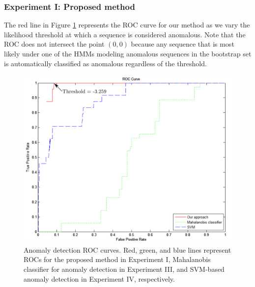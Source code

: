 \subsubsection{Experiment I: Proposed method}

The red line in Figure \ref{fig:batch-roc-results} represents the ROC
curve for our method as we vary the likelihood threshold at which a
sequence is considered anomalous.  Note that the ROC does not
intersect the point $(0, 0)$ because any sequence that is most likely
under one of the HMMs modeling anomalous sequences in the bootstrap
set is automatically classified as anomalous regardless of the
threshold.

\begin{figure}[t]
  \centering
  \includegraphics[width=0.8\linewidth]{figures/roc-ours-vs-ml-results}
  \caption[Anomaly detection ROC curves. Solid red, dotted green, and dashed 
    blue lines represent ROCs for the proposed method in Experiment I, 
    Mahalanobis classifier for anomaly detection in Experiment III, and SVM-based anomaly
    detection in Experiment IV, respectively.]{\small Anomaly
    detection ROC curves. Red, green, and blue lines represent ROCs
    for the proposed method in Experiment I, Mahalanobis classifier for anomaly
    detection in Experiment III, and SVM-based anomaly detection 
    in Experiment IV, respectively.}
  \label{fig:batch-roc-results}
\end{figure}

